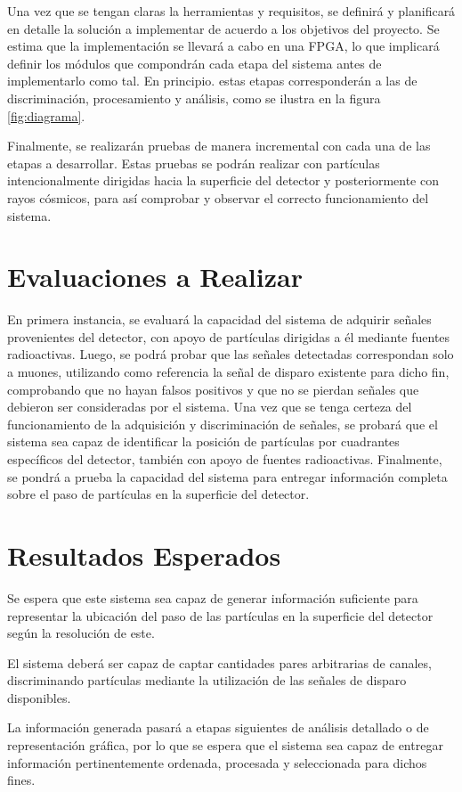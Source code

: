 	\par Una vez que se tengan claras la herramientas y requisitos, se definirá y planificará en detalle la solución a implementar de acuerdo a los objetivos del proyecto. Se estima que la implementación se llevará a cabo en una FPGA, lo que implicará definir los módulos que compondrán cada etapa del sistema antes de implementarlo como tal. En principio. estas etapas corresponderán a las de discriminación, procesamiento y análisis, como se ilustra en la figura \ref{fig:diagrama}. 
	
	\par Finalmente, se realizarán pruebas de manera incremental con cada una de las etapas a desarrollar. Estas pruebas se podrán realizar con partículas intencionalmente dirigidas hacia la superficie del detector y posteriormente con rayos cósmicos, para así comprobar y observar el correcto funcionamiento del sistema.

\section{Evaluaciones a Realizar}
	
	\par En primera instancia, se evaluará la capacidad del sistema de adquirir señales provenientes del detector, con apoyo de partículas dirigidas a él mediante fuentes radioactivas. Luego, se podrá probar que las señales detectadas correspondan solo a muones, utilizando como referencia la señal de disparo existente para dicho fin, comprobando que no hayan falsos positivos y que no se pierdan señales que debieron ser consideradas por el sistema. Una vez que se tenga certeza del funcionamiento de la adquisición y discriminación de señales, se probará que el sistema sea capaz de identificar la posición de partículas por cuadrantes específicos del detector, también con apoyo de fuentes radioactivas. Finalmente, se pondrá a prueba la capacidad del sistema para entregar información completa sobre el paso de partículas en la superficie del detector.
	
	

\section{Resultados Esperados}
	\par Se espera que este sistema sea capaz de generar información suficiente para representar la ubicación del paso de las partículas en la superficie del detector según la resolución de este.
	\par El sistema deberá ser capaz de captar cantidades pares arbitrarias de canales, discriminando partículas mediante la utilización de las señales de disparo disponibles.
	\par La información generada pasará a etapas siguientes de análisis detallado o de representación gráfica, por lo que se espera que el sistema sea capaz de entregar información pertinentemente ordenada, procesada y seleccionada para dichos fines.\\
	 



